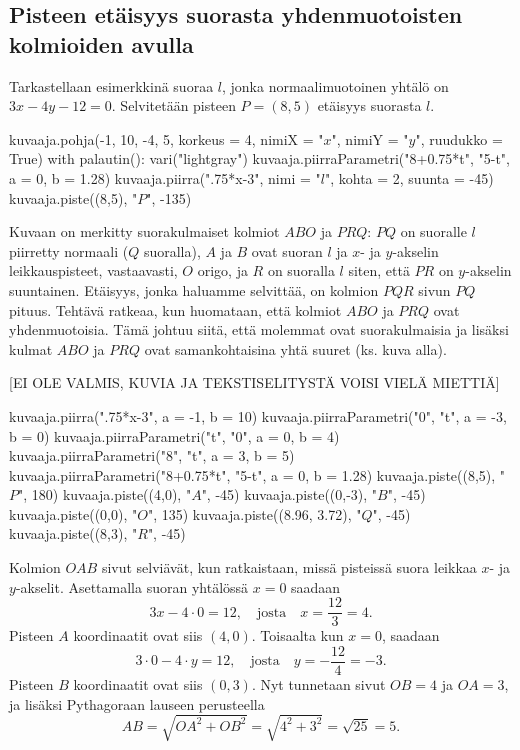 \subsection*{Pisteen etäisyys suorasta yhdenmuotoisten kolmioiden avulla}

Tarkastellaan esimerkkinä suoraa $l$, jonka normaalimuotoinen yhtälö on $3x-4y -12=0$.
Selvitetään pisteen $P=(8, 5)$ etäisyys suorasta $l$.

\begin{kuva}
    kuvaaja.pohja(-1, 10, -4, 5, korkeus = 4, nimiX = "$x$", nimiY = "$y$", ruudukko = True)
    with palautin():
        vari("lightgray")
        kuvaaja.piirraParametri("8+0.75*t", "5-t", a = 0, b = 1.28)
    kuvaaja.piirra(".75*x-3", nimi = "$l$", kohta = 2, suunta = -45)    
    kuvaaja.piste((8,5), "$P$", -135)
\end{kuva}



Kuvaan on merkitty suorakulmaiset kolmiot $ABO$ ja $PRQ$: $PQ$ on suoralle $l$ piirretty normaali ($Q$ suoralla), $A$ ja $B$ ovat suoran $l$ ja $x$- ja $y$-akselin leikkauspisteet, vastaavasti, $O$ origo, ja $R$ on suoralla $l$ siten, että $PR$ on $y$-akselin suuntainen.
Etäisyys, jonka haluamme selvittää, on kolmion $PQR$ sivun $PQ$ pituus.
Tehtävä ratkeaa, kun huomataan, että kolmiot $ABO$ ja $PRQ$ ovat yhdenmuotoisia.
Tämä johtuu siitä, että molemmat ovat suorakulmaisia ja lisäksi kulmat $ABO$ ja $PRQ$ ovat samankohtaisina yhtä suuret (ks. kuva alla).

[EI OLE VALMIS, KUVIA JA TEKSTISELITYSTÄ VOISI VIELÄ MIETTIÄ]

\begin{kuva}
    kuvaaja.piirra(".75*x-3", a = -1, b = 10)
    kuvaaja.piirraParametri("0", "t", a = -3, b = 0)
    kuvaaja.piirraParametri("t", "0", a = 0, b = 4)
    kuvaaja.piirraParametri("8", "t", a = 3, b = 5)
    kuvaaja.piirraParametri("8+0.75*t", "5-t", a = 0, b = 1.28)
    kuvaaja.piste((8,5), "$P$", 180)
    kuvaaja.piste((4,0), "$A$", -45)
    kuvaaja.piste((0,-3), "$B$", -45)
    kuvaaja.piste((0,0), "$O$", 135)
    kuvaaja.piste((8.96, 3.72), "$Q$", -45)
    kuvaaja.piste((8,3), "$R$", -45)
\end{kuva}

Kolmion $OAB$ sivut selviävät, kun ratkaistaan, missä pisteissä suora leikkaa $x$- ja $y$-akselit.
Asettamalla suoran yhtälössä $x=0$ saadaan
\[
3x-4\cdot 0=12, \quad \text{josta} \quad x=\frac{12}{3}=4.
\]
Pisteen $A$ koordinaatit ovat siis $(4, 0)$. Toisaalta kun $x=0$, saadaan
\[
3\cdot 0-4\cdot y=12, \quad \text{josta} \quad y=-\frac{12}{4}=-3.
\]
Pisteen $B$ koordinaatit ovat siis $(0, 3)$. Nyt tunnetaan sivut $OB=4$ ja $OA=3$, ja lisäksi Pythagoraan lauseen perusteella
\[
AB=\sqrt{OA^2+OB^2}=\sqrt{4^2+3^2}=\sqrt{25}=5.
\]

